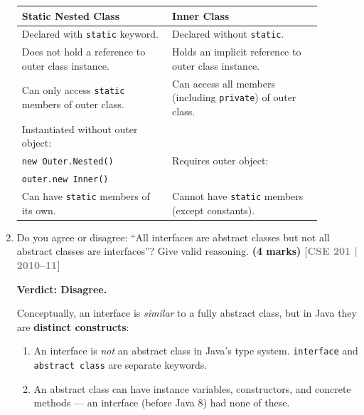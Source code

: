 \documentclass[12pt,a3paper]{article}
\newcommand{\yr}[1]{\hfill\textcolor{gray}{\small\textbf{[#1]}}}
\newcommand{\mk}[1]{\textcolor{orange!70!black}{\small\textbf{(#1 marks)}}}
\begin{document}
\begin{enumerate}
\begin{tcolorbox}[enhanced,breakable,ansbox,
  colback=cD!4,colframe=cD,boxrule=0.8pt,arc=5pt,
  title={\textbf{Answer --- Static Nested Class vs.\ Inner Class}},
  fonttitle=\bfseries\color{white},colbacktitle=cD]
\begin{center}
\small
\begin{tabular}{@{}p{0.44\linewidth}p{0.44\linewidth}@{}}
\toprule
\textbf{Static Nested Class} & \textbf{Inner Class} \\
\midrule
Declared with \texttt{static} keyword. &
Declared without \texttt{static}. \\[4pt]
Does not hold a reference to outer class instance. &
Holds an implicit reference to outer class instance. \\[4pt]
Can only access \texttt{static} members of outer class. &
Can access all members (including \texttt{private}) of outer class. \\[4pt]
Instantiated without outer object:\\
\texttt{new Outer.Nested()} &
Requires outer object:\\
\texttt{outer.new Inner()} \\[4pt]
Can have \texttt{static} members of its own. &
Cannot have \texttt{static} members (except constants). \\
\bottomrule
\end{tabular}
\end{center}

\end{tcolorbox}

\item Do you agree or disagree: ``All interfaces are abstract classes but not all abstract classes are interfaces''? Give valid reasoning. \mk{4}
\yr{CSE 201 | 2010--11}

\begin{tcolorbox}[enhanced,breakable,ansbox,
  colback=cD!4,colframe=cD,boxrule=0.8pt,arc=5pt,
  title={\textbf{Answer --- ``All interfaces are abstract classes but not all abstract classes are interfaces''}},
  fonttitle=\bfseries\color{white},colbacktitle=cD]

\textbf{Verdict: Disagree.}

Conceptually, an interface is \emph{similar} to a fully abstract class,
but in Java they are \textbf{distinct constructs}:

\begin{enumerate}[label=\textbf{\arabic*.}]
  \item An interface is \emph{not} an abstract class in Java's type
    system.  \texttt{interface} and \texttt{abstract class} are
    separate keywords.

  \item An abstract class can have instance variables, constructors,
    and concrete methods --- an interface (before Java 8) had none of
    these.


\end{enumerate}
\end{tcolorbox}
\end{enumerate}
\end{document}
